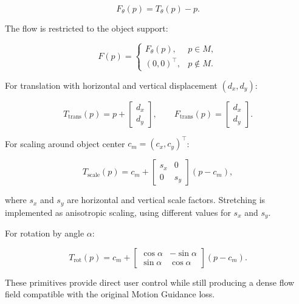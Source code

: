 \begin{equation}
F_\theta(p)=T_\theta(p)-p.
\label{eq:primitive-flow}
\end{equation}

The flow is restricted to the object support:

\begin{equation}
F(p)=
\begin{cases}
F_\theta(p), & p \in M,\\
(0,0)^\top, & p \notin M.
\end{cases}
\label{eq:masked-flow}
\end{equation}

For translation with horizontal and vertical displacement $(d_x,d_y)$:

\begin{equation}
T_{\mathrm{trans}}(p)=p+
\begin{bmatrix}
d_x\\
d_y
\end{bmatrix},
\qquad
F_{\mathrm{trans}}(p)=
\begin{bmatrix}
d_x\\
d_y
\end{bmatrix}.
\label{eq:translation}
\end{equation}

For scaling around object center $c_m=(c_x,c_y)^\top$:

\begin{equation}
T_{\mathrm{scale}}(p)=c_m+
\begin{bmatrix}
s_x & 0\\
0 & s_y
\end{bmatrix}
(p-c_m),
\label{eq:scale}
\end{equation}

where $s_x$ and $s_y$ are horizontal and vertical scale factors. Stretching is implemented as anisotropic scaling, using different values for $s_x$ and $s_y$.

For rotation by angle $\alpha$:

\begin{equation}
T_{\mathrm{rot}}(p)=c_m+
\begin{bmatrix}
\cos\alpha & -\sin\alpha\\
\sin\alpha & \cos\alpha
\end{bmatrix}
(p-c_m).
\label{eq:rotation}
\end{equation}

These primitives provide direct user control while still producing a dense flow field compatible with the original Motion Guidance loss.

